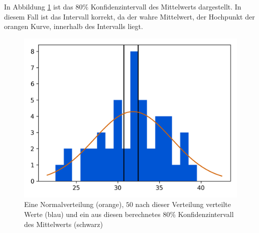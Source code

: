 \documentclass[10pt,twocolumn]{scrartcl}
\begin{document}
		In Abbildung \ref{fig_mean_interval_hist} ist das $80\%$ Konfidenzintervall des Mittelwerts dargestellt. In diesem Fall ist das Intervall korrekt, da der wahre Mittelwert, der Hochpunkt der orangen Kurve, innerhalb des Intervalls liegt.
		\begin{figure}[h]%
			\centering
			\includegraphics[width=0.9\columnwidth]{images/histogram_50_interval_1.png}
			\caption{Eine Normalverteilung (orange), $50$ nach dieser Verteilung verteilte Werte (blau) und ein aus diesen berechnetes $80\%$ Konfidenzintervall des Mittelwerts (schwarz)}
			\label{fig_mean_interval_hist}
		\end{figure}
\end{document}
